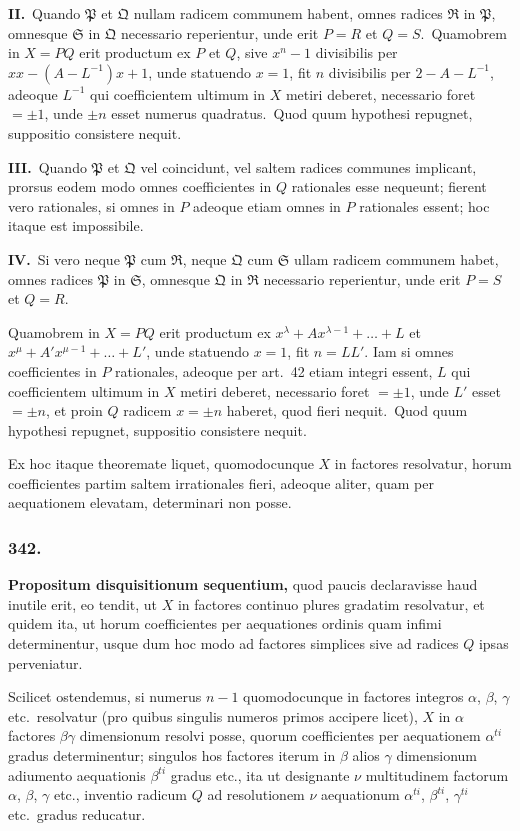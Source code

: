 \documentclass[12pt,a4paper]{article}
\theoremstyle{plain}
\theoremstyle{definition}
\theoremstyle{remark}
\begin{document}
\textbf{II.}\ Quando $\mathfrak{P}$ et $\mathfrak{Q}$ nullam radicem communem habent,
omnes radices $\mathfrak{R}$ in $\mathfrak{P}$, omnesque $\mathfrak{S}$ in $\mathfrak{Q}$ necessario
reperientur, unde erit $P=R$ et $Q=S$.\ Quamobrem in $X=PQ$ erit
productum ex $P$ et $Q$, sive $x^n-1$ divisibilis per $xx-(A-L^{-1})x+1$,
unde statuendo $x=1$, fit $n$ divisibilis per $2-A-L^{-1}$, adeoque
$L^{-1}$ qui coefficientem ultimum in $X$ metiri deberet, necessario foret
$=\pm 1$, unde $\pm n$ esset numerus quadratus.\ Quod quum hypothesi
repugnet, suppositio consistere nequit.

\textbf{III.}\ Quando $\mathfrak{P}$ et $\mathfrak{Q}$ vel coincidunt, vel saltem radices
communes implicant, prorsus eodem modo omnes coefficientes in $Q$
rationales esse nequeunt; fierent vero rationales, si omnes in $P$ adeoque
etiam omnes in $P$ rationales essent; hoc itaque est impossibile.

\textbf{IV.}\ Si vero neque $\mathfrak{P}$ cum $\mathfrak{R}$, neque $\mathfrak{Q}$ cum $\mathfrak{S}$
ullam radicem communem habet, omnes radices $\mathfrak{P}$ in $\mathfrak{S}$, omnesque
$\mathfrak{Q}$ in $\mathfrak{R}$ necessario reperientur, unde erit $P=S$ et $Q=R$.

Quamobrem in $X=PQ$ erit productum ex $x^\lambda+Ax^{\lambda-1}+\dots+L$
et $x^\mu+A'x^{\mu-1}+\dots+L'$, unde statuendo $x=1$, fit $n=LL'$.
Iam si omnes coefficientes in $P$ rationales, adeoque per art.\ 42 etiam
integri essent, $L$ qui coefficientem ultimum in $X$ metiri deberet,
necessario foret $=\pm 1$, unde $L'$ esset $=\pm n$, et proin $Q$ radicem
$x=\pm n$ haberet, quod fieri nequit.\ Quod quum hypothesi repugnet,
suppositio consistere nequit.

Ex hoc itaque theoremate liquet, quomodocunque $X$ in factores
resolvatur, horum coefficientes partim saltem irrationales fieri, adeoque
aliter, quam per aequationem elevatam, determinari non posse.

\subsubsection*{342.}

\textbf{Propositum disquisitionum sequentium,} quod paucis declaravisse
haud inutile erit, eo tendit, ut $X$ in factores continuo plures gradatim
resolvatur, et quidem ita, ut horum coefficientes per aequationes ordinis
quam infimi determinentur, usque dum hoc modo ad factores simplices
sive ad radices $Q$ ipsas perveniatur.

Scilicet ostendemus, si numerus $n-1$ quomodocunque in factores
integros $\alpha$, $\beta$, $\gamma$ etc.\ resolvatur (pro quibus singulis numeros primos
accipere licet), $X$ in $\alpha$ factores $\beta\gamma$ dimensionum resolvi posse, quorum
coefficientes per aequationem $\alpha^{ti}$ gradus determinentur; singulos hos
factores iterum in $\beta$ alios $\gamma$ dimensionum adiumento aequationis
$\beta^{ti}$ gradus etc., ita ut designante $\nu$ multitudinem factorum
$\alpha$, $\beta$, $\gamma$ etc., inventio radicum $Q$ ad resolutionem $\nu$ aequationum
$\alpha^{ti}$, $\beta^{ti}$, $\gamma^{ti}$ etc.\ gradus reducatur.
\end{document}
